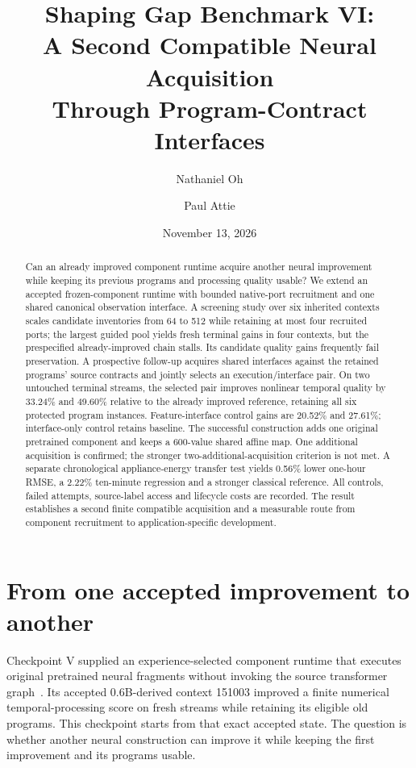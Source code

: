 \documentclass[11pt]{article}
\title{Shaping Gap Benchmark VI:\\A Second Compatible Neural Acquisition\\Through Program-Contract Interfaces}
\author{Nathaniel Oh \and Paul Attie}
\date{November 13, 2026}
\begin{document}
\maketitle
\begin{abstract}
Can an already improved component runtime acquire another neural improvement while keeping its previous programs and processing quality usable? We extend an accepted frozen-component runtime with bounded native-port recruitment and one shared canonical observation interface. A screening study over six inherited contexts scales candidate inventories from 64 to 512 while retaining at most four recruited ports; the largest guided pool yields fresh terminal gains in four contexts, but the prespecified already-improved chain stalls. Its candidate quality gains frequently fail preservation. A prospective follow-up acquires shared interfaces against the retained programs' source contracts and jointly selects an execution/interface pair. On two untouched terminal streams, the selected pair improves nonlinear temporal quality by 33.24\% and 49.60\% relative to the already improved reference, retaining all six protected program instances. Feature-interface control gains are 20.52\% and 27.61\%; interface-only control retains baseline. The successful construction adds one original pretrained component and keeps a 600-value shared affine map. One additional acquisition is confirmed; the stronger two-additional-acquisition criterion is not met. A separate chronological appliance-energy transfer test yields 0.56\% lower one-hour RMSE, a 2.22\% ten-minute regression and a stronger classical reference. All controls, failed attempts, source-label access and lifecycle costs are recorded. The result establishes a second finite compatible acquisition and a measurable route from component recruitment to application-specific development.
\end{abstract}

\section{From one accepted improvement to another}
Checkpoint V supplied an experience-selected component runtime that executes original pretrained neural fragments without invoking the source transformer graph~\cite{sg5}. Its accepted 0.6B-derived context 151003 improved a finite numerical temporal-processing score on fresh streams while retaining its eligible old programs. This checkpoint starts from that exact accepted state. The question is whether another neural construction can improve it while keeping the first improvement and its programs usable.
\end{document}

